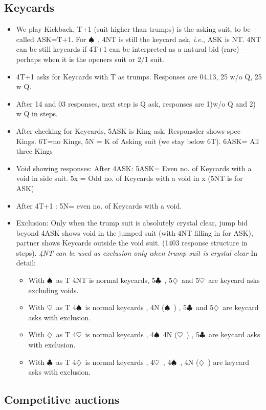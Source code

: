 \documentclass{article}
\newcommand\C{\ensuremath{\clubsuit}}
\newcommand\D{\ensuremath{\diamondsuit}}
\renewcommand\H{\ensuremath{\heartsuit}}
\renewcommand\S{\ensuremath{\spadesuit}}
\begin{document}
\begin{multicols}{2}
  \subsection{Keycards}
  \label{kickback}
  \begin{itemize}
\item We play Kickback, T+1 (suit higher than trumps) is the asking suit, to be called ASK=T+1. For \S\ , 4NT is still the keycard ask, \textit{i.e.},  ASK is NT. 4NT can be still keycards if 4T+1 can be interpreted as a natural bid (rare)--- perhaps when it is the openers suit or 2/1 suit.
\item   4T+1 asks for Keycards with T as trumps. Responses are 04,13, 25 w/o Q, 25 w Q.
 \item After 14 and 03 responses, next step is Q ask, responses are 1)w/o Q and 2) w Q in steps.
 \item After checking for Keycards, 5ASK is King ask. Responsder shows spec Kings. 6T=no Kings, 5N = K of Asking suit (we stay below 6T). 6ASK= All three Kings
 \item Void showing responses: After 4ASK: 5ASK= Even no. of Keycards with a void in side suit. 5x = Odd no. of Keycards with a void in x (5NT is for ASK)
 \item After 4T+1 : 5N= even no. of Keycards with a void.
 \item Exclusion: Only when the trump suit is absolutely crystal clear, jump bid beyond 4ASK shows void in the jumped suit (with 4NT filling in for ASK), partner shows Keycards outside the void suit. (1403 response structure in steps). \emph{4NT can be used as exclusion only when trump suit is crystal clear}
   In detail: 
   \begin{itemize}
     \item With  \S\ as T 4NT is normal keycards, 5\C\ , 5\D\ and 5\H\ are keycard asks excluding voids.
     \item With \H\ as T 4\S\ is normal keycards , 4N (\S\ ) , 5\C\ and 5\D\ are keycard asks with exclusion.
     \item With \D\ as T 4\H\ is normal keycards , 4\S\ 4N (\H\ ) , 5\C\   are keycard asks with exclusion.
     \item With \C\ as T 4\D\ is normal keycards , 4\H\ , 4\S\ ,  4N (\D\ )    are keycard asks with exclusion.
     \end{itemize}
 \end{itemize}


  \subsection{Competitive auctions}
  \label{comp}

\end{multicols}
\end{document}
